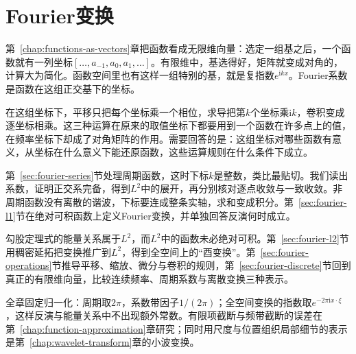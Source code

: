 \chapter{Fourier变换}
\label{chap:fourier-transform}
\label{chap:orthogonal-expansions-transforms}

第~\ref{chap:functions-as-vectors}章把函数看成无限维向量：选定一组基之后，一个函数就有一列坐标$[\ldots,a_{-1},a_0,a_1,\ldots]$。有限维中，基选得好，矩阵就变成对角的，计算大为简化。函数空间里也有这样一组特别的基，就是复指数$e^{\mathrm ikx}$。Fourier系数是函数在这组正交基下的坐标。

在这组坐标下，平移只把每个坐标乘一个相位，求导把第$k$个坐标乘$\mathrm ik$，卷积变成逐坐标相乘。这三种运算在原来的取值坐标下都要用到一个函数在许多点上的值，在频率坐标下却成了对角矩阵的作用。需要回答的是：这组坐标对哪些函数有意义，从坐标在什么意义下能还原函数，这些运算规则在什么条件下成立。

第~\ref{sec:fourier-series}节处理周期函数，这时下标$k$是整数，类比最贴切。我们读出系数，证明正交系完备，得到$L^2$中的展开，再分别核对逐点收敛与一致收敛。非周期函数没有离散的谐波，下标要连成整条实轴，求和变成积分。第~\ref{sec:fourier-l1}节在绝对可积函数上定义Fourier变换，并单独回答反演何时成立。

勾股定理式的能量关系属于$L^2$，而$L^2$中的函数未必绝对可积。第~\ref{sec:fourier-l2}节用稠密延拓把变换推广到$L^2$，得到全空间上的“酉变换”。第~\ref{sec:fourier-operations}节推导平移、缩放、微分与卷积的规则，第~\ref{sec:fourier-discrete}节回到真正的有限维向量，比较连续频率、周期系数与离散变换三种表示。

全章固定归一化：周期取$2\pi$，系数带因子$1/(2\pi)$；全空间变换的指数取$e^{-2\pi\mathrm ix\cdot\xi}$，这样反演与能量关系中不出现额外常数。有限项截断与频带截断的误差在第~\ref{chap:function-approximation}章研究；同时用尺度与位置组织局部细节的表示是第~\ref{chap:wavelet-transform}章的小波变换。







